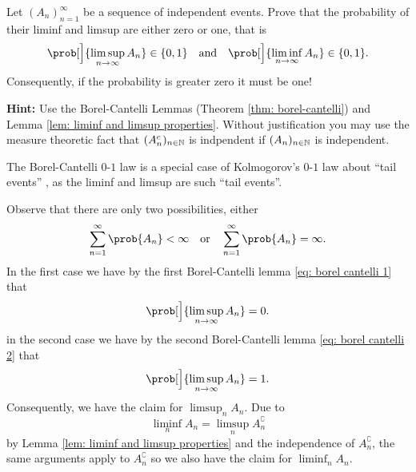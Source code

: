 \begin{exercise}
    \label{ex: borel cantelli 0-1 law}
    Let \((A_n)_{n=1}^\infty\) be a sequence of independent events. Prove that 
    the probability of their liminf and limsup are either zero or one, that is
    \[
        \prob[\Big]{\limsup_{n\to \infty} A_n} \in \{0,1\}
        \quad\text{and}\quad
        \prob[\Big]{\liminf_{n\to \infty} A_n} \in \{0,1\}.
    \]
    Consequently, if the probability is greater zero it must be one!

    \noindent\textbf{Hint:} Use the Borel-Cantelli Lemmas (Theorem \ref{thm: borel-cantelli})
    and Lemma \ref{lem: liminf and limsup properties}. Without justification you
    may use the measure theoretic fact that \((A_n^c)_{n\in \mathbb{N}}\)
    is indpendent if \((A_n)_{n\in \mathbb{N}}\) is independent.
    \begin{remark}
        \label{rem: kolmogorov 0-1 law}
        The Borel-Cantelli \(0\)-\(1\) law is a special case of Kolmogorov's \(0\)-\(1\) law
        about ``tail events'' \citep[Thm.~2.37, Cor.~2.38]{klenkeProbabilityTheoryComprehensive2014},
        as the liminf and limsup are such ``tail events''.
    \end{remark}

    \begin{solution}
        Observe that there are only two possibilities, either
        \[
            \sum_{n=1}^\infty \prob{A_n} < \infty
                \quad\text{or}\quad
            \sum_{n=1}^\infty \prob{A_n} = \infty.
        \]
        In the first case we have by the first Borel-Cantelli lemma \eqref{eq: borel cantelli 1} that
        \[
            \prob[\Big]{\limsup_{n\to \infty} A_n} = 0.
        \]
        in the second case we have by the second Borel-Cantelli lemma \eqref{eq: borel cantelli 2} that
        \[
            \prob[\Big]{\limsup_{n\to \infty} A_n} = 1.
        \]
        Consequently, we have the claim for \(\limsup_n A_n\). Due to
        \[
            \liminf_n A_n = \limsup_n A_n^\complement
        \]
        by Lemma \ref{lem: liminf and limsup properties} and the independence of
        \(A_n^\complement\), the
        same arguments apply to \(A_n^\complement\) so we also have the claim for
        \(\liminf_n A_n\).
        \qedhere
    \end{solution}
\end{exercise}

